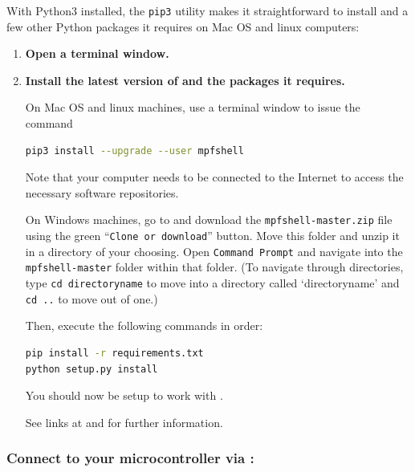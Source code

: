 With Python3 installed, the \texttt{pip3} utility makes it straightforward to install \mpfshell and a few other Python packages it requires on Mac OS and linux computers:
\begin{enumerate}
	\item \textbf{Open a terminal window.}
	\item \textbf{Install the latest version of \mpfshell and the packages it requires.}

	On Mac OS and linux machines, use a terminal window to issue the command
\begin{lstlisting}[language=bash]
pip3 install --upgrade --user mpfshell
\end{lstlisting}
		Note that your computer needs to be connected to the Internet to access the necessary software repositories.

		\smallskip
		On Windows machines, go to  and download the
		 \lstinline{mpfshell-master.zip} file using the green ``\texttt{Clone or download}'' button.
		Move this folder and unzip it in a directory of your choosing.
		Open \lstinline{Command Prompt} and navigate into the \texttt{mpfshell-master} folder within that folder.
		(To navigate through directories, type \lstinline{cd directoryname} to move into a directory called ‘directoryname’ and \lstinline{cd ..} to move out of one.)

		Then, execute the following commands in order:
\begin{lstlisting}[language=bash]
pip install -r requirements.txt
python setup.py install
\end{lstlisting}
		You should now be setup to work with \mpfshell.

		See links at  and  for further information.
\end{enumerate}

\subsubsection{\howto Connect to your microcontroller via \mpfshell:}

